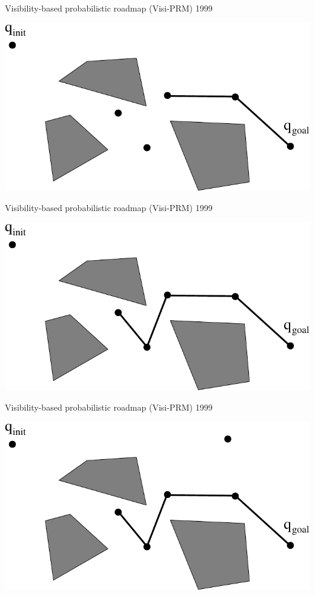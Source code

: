 \begin{frame} {Visibility-based probabilistic roadmap (Visi-PRM) 1999}
\centerline {
  \includegraphics[width=.8\linewidth]{figures/VPRM12.pdf}
}
\end{frame}

\begin{frame} {Visibility-based probabilistic roadmap (Visi-PRM) 1999}
\centerline {
  \includegraphics[width=.8\linewidth]{figures/VPRM13.pdf}
}
\end{frame}

\begin{frame} {Visibility-based probabilistic roadmap (Visi-PRM) 1999}
\centerline {
  \includegraphics[width=.8\linewidth]{figures/VPRM14.pdf}
}
\end{frame}

